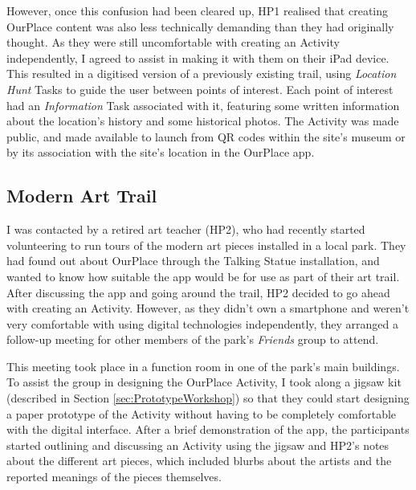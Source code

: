 However, once this confusion had been cleared up, HP1 realised that creating OurPlace content was also less technically demanding than they had originally thought. As they were still uncomfortable with creating an Activity independently, I agreed to assist in making it with them on their iPad device. This resulted in a digitised version of a previously existing trail, using \textit{Location Hunt} Tasks to guide the user between points of interest. Each point of interest had an \textit{Information} Task associated with it, featuring some written information about the location's history and some historical photos. The Activity was made public, and made available to launch from QR codes within the site's museum or by its association with the site's location in the OurPlace app.

\subsection{Modern Art Trail}

I was contacted by a retired art teacher (HP2), who had recently started volunteering to run tours of the modern art pieces installed in a local park. They had found out about OurPlace through the Talking Statue installation, and wanted to know how suitable the app would be for use as part of their art trail. After discussing the app and going around the trail, HP2 decided to go ahead with creating an Activity. However, as they didn't own a smartphone and weren't very comfortable with using digital technologies independently, they arranged a follow-up meeting for other members of the park's \textit{Friends} group to attend.

This meeting took place in a function room in one of the park's main buildings. To assist the group in designing the OurPlace Activity, I took along a jigsaw kit (described in Section \ref{sec:PrototypeWorkshop}) so that they could start designing a paper prototype of the Activity without having to be completely comfortable with the digital interface. After a brief demonstration of the app, the participants started outlining and discussing an Activity using the jigsaw and HP2's notes about the different art pieces, which included blurbs about the artists and the reported meanings of the pieces themselves. 

